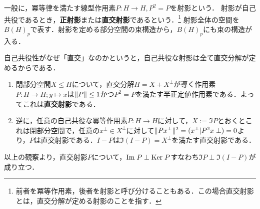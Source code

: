 \documentclass[uplatex,dvipdfmx]{jsreport}
\begin{document}
\begin{definition}
    一般に，冪等律を満たす線型作用素$P:H\to H,P^2=P$を射影という．
    射影が自己共役であるとき，\textbf{正射影}または\textbf{直交射影}であるという．\footnote{前者を冪等作用素，後者を射影と呼び分けることもある．この場合直交射影とは，直交分解が定める射影のことを指す．}
    射影全体の空間を$B(H)_p$で表す．射影を定める部分空間の束構造から，$B(H)_p$にも束の構造が入る．
\end{definition}
\begin{example}[直交射影の直交分解による特徴付け]
    自己共役性がなぜ「直交」なのかというと，自己共役な射影は全て直交分解が定めるからである．
    \begin{enumerate}
        \item 閉部分空間$X\le H$について，直交分解$H=X+X^\perp$が導く作用素$P:H\to H;y\mapsto x$は$\|P\|\le 1$かつ$P^2=P$を満たす半正定値作用素である．よってこれは\textbf{直交射影}である．
        \item 逆に，任意の自己共役な冪等作用素$P:H\to H$に対して，$X:=\Im P$とおくとこれは閉部分空間で，任意の$x^\perp\in X^\perp$に対して$\|Px^\perp\|^2=(x^\perp|P^2x\perp)=0$より，$P$は直交射影である．$I-P$は$\Im(I-P)=X^\perp$を満たす直交射影である．
    \end{enumerate}
    以上の観察より，直交射影$P$について，$\mathrm{Im}\; P\perp\mathrm{Ker}\; P$すなわち$\Im P\perp\Im(I-P)$が成り立つ．
\end{example}
\end{document}
